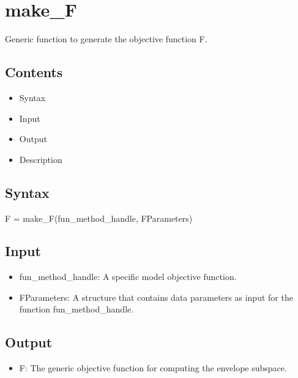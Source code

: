\documentclass[a4paper,11pt,openany]{memoir}
\begin{document}
\newpage

\rmfamily
\color{black}\section{make\_F}

\begin{par}
Generic function to generate the objective function F.
\end{par} \vspace{1em}

\subsection*{Contents}

\begin{itemize}
\setlength{\itemsep}{-1ex}
   \item Syntax
   \item Input
   \item Output
   \item Description
\end{itemize}


\subsection*{Syntax}

\begin{par}
F = make\_F(fun\_method\_handle, FParameters)
\end{par} \vspace{1em}


\subsection*{Input}

\begin{itemize}
\setlength{\itemsep}{-1ex}
   \item fun\_method\_handle: A specific model objective function.
   \item FParameters: A structure that contains data parameters as input for the function fun\_method\_handle.
\end{itemize}


\subsection*{Output}

\begin{itemize}
\setlength{\itemsep}{-1ex}
   \item F: The generic objective function for computing the envelope subspace.
\end{itemize}
\end{document}
